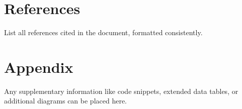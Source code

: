\documentclass[12pt,a4paper]{report}
\begin{document}
\chapter*{References}
    List all references cited in the document, formatted consistently.

\appendix
\chapter{Appendix}
    Any supplementary information like code snippets, extended data tables, or additional diagrams can be placed here.
\end{document}
